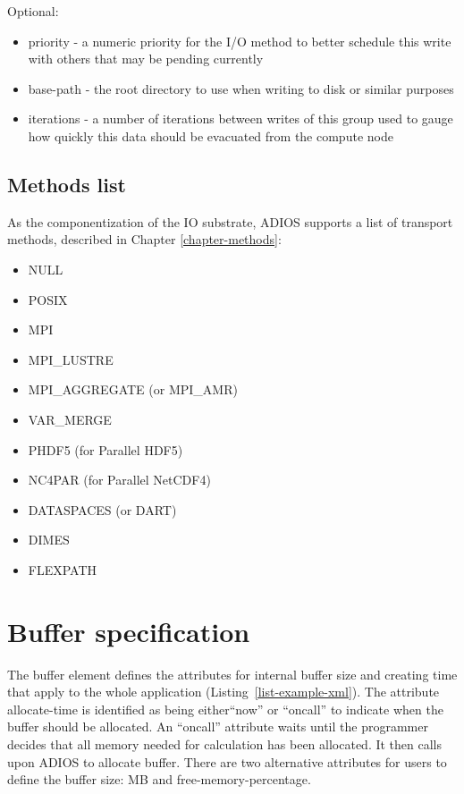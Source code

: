 Optional: 
\begin{itemize}
\item priority - a numeric priority for the I/O method to better schedule this write with 
others that may be pending currently
\item base-path - the root directory to use when writing to disk or similar purposes
\item iterations - a number of iterations between writes of this group used to gauge how 
quickly this data should be evacuated from the compute node
\end{itemize}

\subsection{Methods list}
As the componentization of the IO substrate, ADIOS supports a list of transport 
methods, described in Chapter \ref{chapter-methods}:

\begin{itemize}
\item NULL
\item POSIX
\item MPI
\item MPI\_LUSTRE
\item MPI\_AGGREGATE (or MPI\_AMR)
\item VAR\_MERGE
\item PHDF5 (for Parallel HDF5)
\item NC4PAR (for Parallel NetCDF4)
\item DATASPACES (or DART)
\item DIMES
\item FLEXPATH
\end{itemize}



\section{Buffer specification}
\label{section-xml-buffers-pecification}
The buffer element defines the attributes for internal buffer size and creating 
time that apply to the whole application (Listing~\ref{list-example-xml}). The attribute allocate-time 
is identified as being either{\small  ``}now'' or ``oncall'' to indicate when the 
buffer should be allocated. An ``oncall'' attribute waits until the programmer 
decides that all memory needed for calculation has been allocated. It then calls 
upon ADIOS to allocate buffer. There are two alternative attributes for users to 
define the buffer size: MB and free-memory-percentage. 

